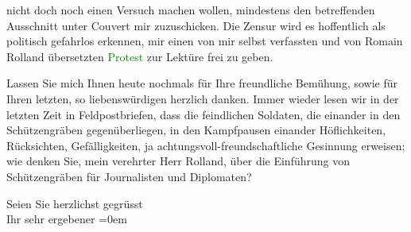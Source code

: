                nicht doch noch einen Versuch machen wollen, mindestens den betreffenden Ausschnitt
               unter Couvert mir zuzuschicken. Die Zensur wird es hoffentlich als politisch
               gefahrlos erkennen, mir einen von mir selbst verfassten und von Romain Rolland
               übersetzten \textcolor{green}{Protest}\ledrightnote{{$\rightarrow$}\emph{\textcolor{green}{Une protestation d’Arthur Schnitzler}}} zur
               Lektüre frei zu geben.\pend
           
\pstart
           Lassen Sie mich Ihnen heute nochmals für Ihre freundliche Bemühung, sowie für Ihren
               letzten, so liebenswürdigen \label{K_L03885-1v}\label{K_L03885-1} herzlich danken. Immer wieder lesen wir in der
               letzten Zeit in Feldpostbriefen, dass die feindlichen Soldaten, die einander in den
               Schützengräben gegenüberliegen, in den Kampfpausen einander Höflichkeiten,
               Rücksichten, Gefälligkeiten, ja achtungsvoll-freundschaftliche Gesinnung erweisen;
               wie denken Sie, mein verehrter Herr Rolland, über die Einführung von Schützengräben
               für Journalisten und Diplomaten?\pend
           
\pstart
           Seien Sie herzlichst gegrüsst{\\[\baselineskip]}Ihr sehr ergebener\pend
           \leftskip=0em{}\endnumbering{}
\begin{anhang}
\end{anhang}
      